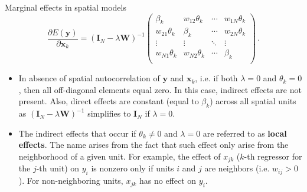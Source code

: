 \documentclass{beamer}
\begin{document}
\begin{frame}{Marginal effects in spatial models}
\vspace{-0.3cm}
\begin{equation*}
\frac{\partial E(\bm{y})}{\partial \bm{x}_k}
    =(\bm{I}_N - \lambda \bm{W})^{-1}
	\begin{pmatrix}
		\beta_{k} & w_{12}\theta_{k}& \cdots & w_{1N}\theta_{k}\\
		w_{21}\theta_{k}& \beta_{k} & \cdots & w_{2N}\theta_{k}\\
		\vdots & \vdots & \ddots & \vdots \\
		w_{N1}\theta_{k} & w_{N2}\theta_{k} & \cdots & \beta_{k} \\
	\end{pmatrix}\,. 
\end{equation*}
\begin{itemize}
	\item In absence of spatial autocorrelation of $\bm{y}$ and $\bm{x}_k$, i.e. if both $\lambda = 0$ and $\theta_k = 0$, then all off-diagonal elements equal zero. In this case, indirect effects are not present. Also, direct effects are constant (equal to $\beta_k$) across all spatial units as $(\bm{I}_N - \lambda \bm{W})^{-1}$ simplifies to $\bm{I}_N$ if $\lambda=0$. 
	\medskip
    \item The indirect effects that occur if $\theta_k \neq 0$ and $\lambda = 0$ are referred to as \textbf{local effects}. The name arises from the fact that such effect only arise from the neighborhood of a given unit. For example, the effect of $x_{jk}$ ($k$-th regressor for the $j$-th unit) on $y_i$ is nonzero only if units $i$ and $j$ are neighbors (i.e. $w_{ij} > 0$). For non-neighboring units, $x_{jk}$ has no effect on $y_i$.
\end{itemize}	
\end{frame}
\end{document}
